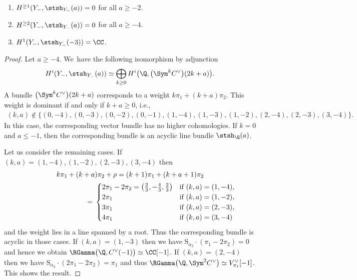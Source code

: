 \begin{Proposition} \label{prop minus 1}\quad
\begin{enumerate}\itemsep=0pt
\item[$1.$] $H^{\geq 1}(Y_-, \stsh_{Y_-}(a)) = 0$ for all $a \geq -2$.
\item[$2.$] $H^{\geq 2}(Y_-, \stsh_{Y_-}(a)) = 0$ for all $a \geq -4$.
\item[$3.$] $H^1(Y_-, \stsh_{Y_-}(-3)) = \CC$.
\end{enumerate}
\end{Proposition}

\begin{proof}
Let $a \geq -4$.
We~have the following isomorphism by adjunction
\begin{gather*}
H^i(Y_-, \stsh_{Y_-}(a)) \simeq \bigoplus_{k \geq 0} H^i\big(\Q, \big(\Sym^k C^{\vee}\big)(2k+a)\big).
\end{gather*}
A bundle $\big(\Sym^k C^{\vee}\big)(2k+a)$ corresponds to a weight $k \pi_1 + (k+a)\pi_2$.
This weight is dominant if and only if $k + a \geq 0$, i.e.,
\begin{gather*}
(k,a) \notin \{ (0, -4), (0,-3), (0,-2), (0,-1), (1, -4), (1, -3), (1, -2), (2,-4), (2,-3), (3,-4) \}.
\end{gather*}
In this case, the corresponding vector bundle has no higher cohomologies.
If $k = 0$ and $a \leq -1$, then the corresponding bundle is an acyclic line bundle $\stsh_{\Q}(a)$.

Let us consider the remaining cases.
If $(k, a) = (1, -4), (1, -2), (2,-3), (3,-4)$ then
\begin{gather*}
k\pi_1+(k+a)\pi_2 + \rho = (k+1)\pi_1+(k+a+1)\pi_2
\\ \hphantom{k\pi_1+(k+a)\pi_2 + \rho}
={}\begin{cases}
2\pi_1 -2 \pi_2 =\big(\frac{2}{3}, - \frac{4}{3}, \frac{2}{3}\big) & \text{if} \ (k,a) = (1, -4), \\
2\pi_1 & \text{if} \  (k,a) = (1,-2), \\
3\pi_1 & \text{if} \  (k,a) = (2,-3), \\
4\pi_1 & \text{if} \  (k,a) = (3,-4)
\end{cases}
\end{gather*}
and the weight lies in a line spanned by a root.
Thus the corresponding bundle is acyclic in those cases.
If $(k,a) = (1,-3)$ then we have
$\mathrm{S}_{\alpha_2} \cdot (\pi_1 -2\pi_2) = 0$
and hence we obtain
$\RGamma\big(\Q, C^{\vee}(-1)\big) \simeq \CC[-1]$.
If $(k,a) = (2,-4)$ then we have
$\mathrm{S}_{\alpha_2} \cdot (2\pi_1 - 2\pi_2) = \pi_1$
and thus
$\RGamma\big(\Q, \Sym^2C^{\vee}\big) \simeq V_{\pi_1}^{\vee}[-1]$.
This shows the result.
\end{proof}

